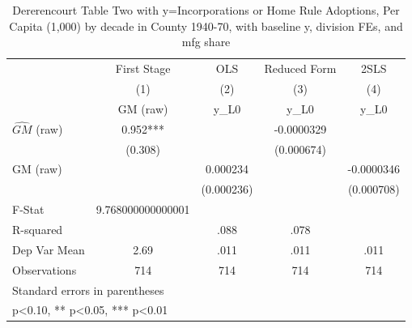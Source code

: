 \begin{table}[htbp]\centering
\def\sym#1{\ifmmode^{#1}\else\(^{#1}\)\fi}
\caption{Dererencourt Table Two with y=Incorporations or Home Rule Adoptions, Per Capita (1,000) by decade in County 1940-70, with baseline y, division FEs, and mfg share}
\begin{tabular}{l*{4}{c}}
\toprule
                    & First Stage   &         OLS   &Reduced Form   &        2SLS   \\
                    &\multicolumn{1}{c}{(1)}&\multicolumn{1}{c}{(2)}&\multicolumn{1}{c}{(3)}&\multicolumn{1}{c}{(4)}\\
                    &\multicolumn{1}{c}{GM  (raw)}&\multicolumn{1}{c}{y\_L0}&\multicolumn{1}{c}{y\_L0}&\multicolumn{1}{c}{y\_L0}\\
\midrule
$\hat{GM}$ (raw)    &       0.952***&               &  -0.0000329   &               \\
                    &     (0.308)   &               &  (0.000674)   &               \\
\addlinespace
GM  (raw)           &               &    0.000234   &               &  -0.0000346   \\
                    &               &  (0.000236)   &               &  (0.000708)   \\
\midrule
F-Stat              &9.768000000000001   &               &               &               \\
R-squared           &               &        .088   &        .078   &               \\
Dep Var Mean        &        2.69   &        .011   &        .011   &        .011   \\
Observations        &         714   &         714   &         714   &         714   \\
\bottomrule
\multicolumn{5}{l}{\footnotesize Standard errors in parentheses}\\
\multicolumn{5}{l}{\footnotesize * p<0.10, ** p<0.05, *** p<0.01}\\
\end{tabular}
\end{table}

